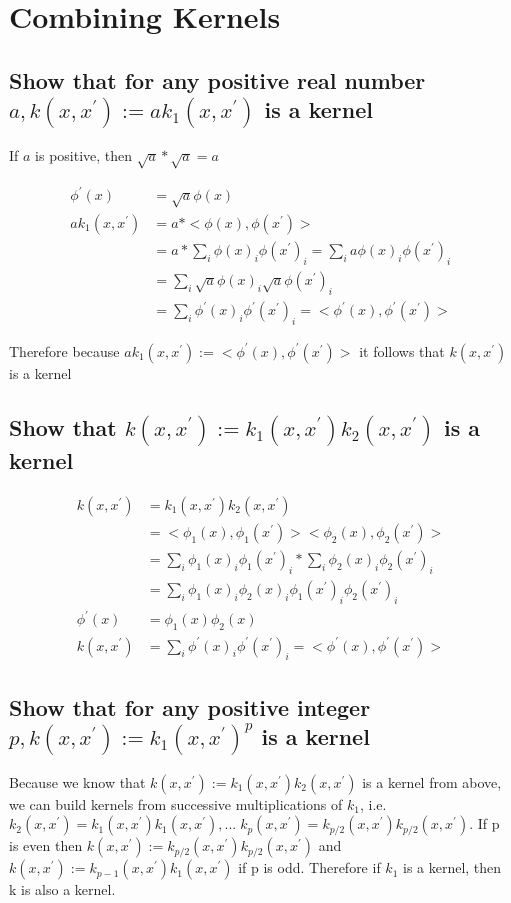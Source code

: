 \documentclass[11pt]{article}
\theoremstyle{quest}
\newcommand{\problem}[1]{\section{#1}}        %
\newcommand{\subproblem}[1]{\subsection{#1}}      %
\begin{document}
\problem{Combining Kernels}
\subproblem{Show that for any positive real number $a, k(x, x^{'}) := ak_1(x, x^{'})$ is a kernel}

\begin{adjustwidth}{3.5em}{0em}
If $a$ is positive, then $\sqrt{a}*\sqrt{a}=a$
\end{adjustwidth}
\begin{align*}
 \phi^{'}(x) &= \sqrt{a}\phi(x) \\
ak_1(x, x^{'}) &= a * <\phi(x), \phi(x^{'})> \\
&= a * \sum_i{\phi(x)_i\phi(x^{'})_i} = \sum_i{a\phi(x)_i\phi(x^{'})_i} \\
&= \sum_i{\sqrt{a}\phi(x)_i\sqrt{a}\phi(x^{'})_i} \\
&= \sum_i{ \phi^{'}(x)_i \phi^{'}(x^{'})_i} = <\phi^{'}(x), \phi^{'}(x^{'})> 
\end{align*}
\begin{adjustwidth}{3.5em}{0em}
Therefore because $ak_1(x, x^{'}) := <\phi^{'}(x), \phi^{'}(x^{'})>$ it follows that $k(x,x^{'})$ is a kernel
\end{adjustwidth}


\subproblem{Show that $k(x, x^{'}) := k_1(x, x^{'})k_2(x, x^{'})$ is a kernel}

\begin{align*}
k(x, x^{'}) &= k_1(x, x^{'})k_2(x, x^{'}) \\
 			&= <\phi_1(x), \phi_1(x^{'})><\phi_2(x), \phi_2(x^{'})> \\
 			&= \sum_i{\phi_1(x)_i\phi_1(x^{'})_i} * \sum_i{\phi_2(x)_i\phi_2(x^{'})_i} \\
 			&= \sum_i{\phi_1(x)_i\phi_2(x)_i\phi_1(x^{'})_i\phi_2(x^{'})_i} \\
\phi^{'}(x) &= \phi_1(x)\phi_2(x) \\
k(x, x^{'}) &= \sum_i{ \phi^{'}(x)_i \phi^{'}(x^{'})_i} = <\phi^{'}(x), \phi^{'}(x^{'})> 
\end{align*}

\subproblem{Show that for any positive integer $p, k(x, x^{'}) := k_1(x, x^{'})^p$ is a kernel}

\begin{adjustwidth}{3.5em}{0em}
Because we know that $k(x, x^{'}) := k_1(x, x^{'})k_2(x, x^{'})$ is a kernel from above, we can build kernels from successive multiplications of $k_1$, i.e. $k_2(x, x^{'}) = k_1(x, x^{'})k_1(x, x^{'}), ...\; k_p(x, x^{'}) = k_{p/2}(x, x^{'})k_{p/2}(x, x^{'})$. If p is even then $k(x, x^{'}) := k_{p/2}(x, x^{'})k_{p/2}(x, x^{'})$ and $k(x, x^{'}) := k_{p-1}(x, x^{'})k_{1}(x, x^{'})$ if p is odd. Therefore if $k_1$ is a kernel, then k is also a kernel.
\end{adjustwidth}
\end{document}
